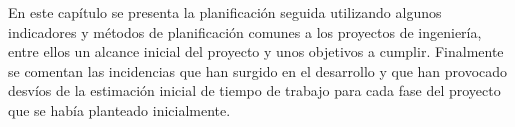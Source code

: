 En este capítulo se presenta la planificación seguida utilizando algunos indicadores y métodos de planificación comunes a los proyectos de ingeniería, entre ellos un alcance inicial del proyecto y unos objetivos a cumplir. 
Finalmente se comentan las incidencias que han surgido en el desarrollo y que han provocado desvíos de la estimación inicial de tiempo de trabajo para cada fase del proyecto que se había planteado inicialmente.